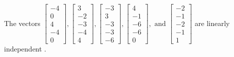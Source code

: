 \begin{exercise}
\begin{exerciseStatement}
  \end{exerciseStatement}
  \begin{exerciseAnswer}
   The vectors \(\left[\begin{array}{r}
-4 \\
0 \\
4 \\
-4 \\
0
\end{array}\right] , \left[\begin{array}{r}
3 \\
-2 \\
-3 \\
-4 \\
4
\end{array}\right] , \left[\begin{array}{r}
-3 \\
3 \\
-3 \\
-3 \\
-6
\end{array}\right] , \left[\begin{array}{r}
4 \\
-1 \\
-6 \\
-6 \\
0
\end{array}\right] , \text{ and } \left[\begin{array}{r}
-2 \\
-1 \\
-2 \\
-1 \\
1
\end{array}\right]\) are 
  	 linearly independent  .
  


  \end{exerciseAnswer}
\end{exercise}